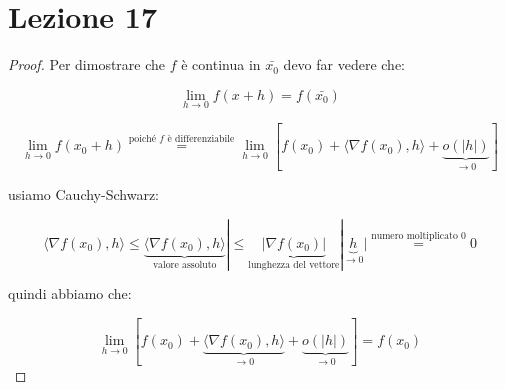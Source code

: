 \documentclass[11pt]{article}
\begin{document}
\newpage

\section{Lezione 17}



\begin{proof}
     Per dimostrare che $f$ è continua in $\bar{x_0} $ devo far vedere che:

     \[
         \lim_{ h \to 0 } f(x+h) = f( \bar{x_0} ) 
     \]

     \[
        \lim_{ h \to 0 } f(x_0 + h ) \overset{\text{poiché $f$ è differenziabile}}{=} \lim_{ h \to 0 } [f(x_0) + \langle \nabla f(x_0),h \rangle + \underbrace{o(|h|)}_\text{$\rightarrow 0$}]
     \]

     usiamo Cauchy-Schwarz:

     \[
        \langle \nabla f(x_0),h \rangle   \le  \underbrace{\langle \nabla f(x_0),h \rangle}_\text{valore assoluto}| \le  \underbrace{|\nabla f(x_0)|}_\text{lunghezza del vettore} | \underbrace{h}_\text{$\rightarrow 0$}| \overset{\text{numero moltiplicato $0$}}{=} 0
     \]

     quindi abbiamo che:

     \[
         \lim_{ h \to 0 } [f(x_0) + \underbrace{\langle \nabla f(x_0),h \rangle}_\text{$\rightarrow 0$} + \underbrace{o(|h|)}_\text{$\rightarrow 0$}] = f(x_0)
     \]
\end{proof}


\end{document}
